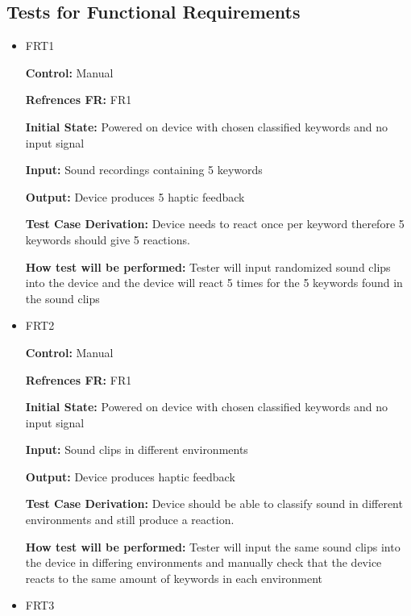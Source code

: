 \documentclass[12pt, titlepage]{article}
\begin{document}
\subsection{Tests for Functional Requirements}

\begin{itemize}

\item{FRT1}

\textbf{Control:} Manual

\textbf{Refrences FR:} FR1 					

\textbf{Initial State:} Powered on device with chosen classified keywords and no input signal
					
\textbf{Input:} Sound recordings containing 5 keywords
					
\textbf{Output:} Device produces 5 haptic feedback

\textbf{Test Case Derivation:} Device needs to react once per keyword therefore 5 keywords should give 5 reactions.
					
\textbf{How test will be performed:} Tester will input randomized sound clips into the device and the device will react 5 times for the 5 keywords found in the sound clips
 

\item{FRT2}

\textbf{Control:} Manual

\textbf{Refrences FR:} FR1 					

\textbf{Initial State:} Powered on device with chosen classified keywords and no input signal 
					
\textbf{Input:} Sound clips in different environments
					
\textbf{Output:} Device produces haptic feedback

\textbf{Test Case Derivation:} Device should be able to classify sound in different environments and still produce a reaction.
					
\textbf{How test will be performed:} Tester will input the same sound clips into the device in differing environments and manually check that the device reacts to the same amount of keywords in each environment 

\item{FRT3}


\end{itemize}
\end{document}
